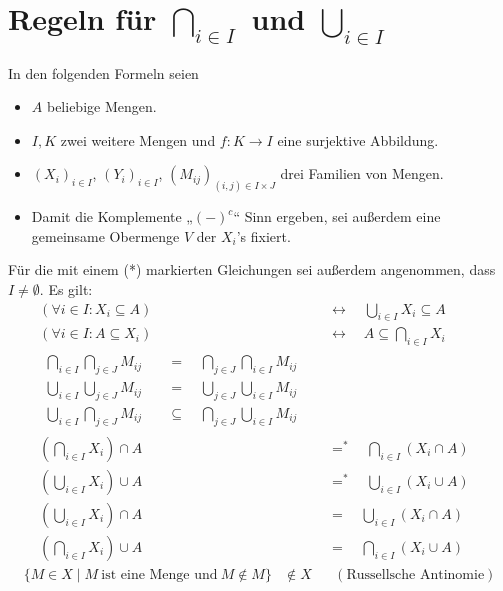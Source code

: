 \endgroup




 
\section{Regeln für $\bigcap_{i\in I}$ und $\bigcup_{i\in I}$}
In den folgenden Formeln seien
\begin{itemize}
    \item $A$ beliebige Mengen.
    \item $I,K$ zwei weitere Mengen und $f:K\to I$ eine surjektive Abbildung.
    \item $(X_i)_{i\in I}$, $(Y_i)_{i\in I}$, $(M_{ij})_{(i,j)\in I\times J}$ drei Familien von Mengen.
    \item Damit die Komplemente „$(-)^c$“ Sinn ergeben, sei außerdem eine gemeinsame Obermenge $V$ der $X_i$'s fixiert.
\end{itemize}
Für die mit einem (*) markierten Gleichungen sei außerdem angenommen, dass $I\neq\emptyset$. Es gilt:
\begingroup
\allowdisplaybreaks
\begin{align*}
    (\forall i\in I : X_i \subseteq A) & \quad\leftrightarrow\quad \bigcup_{i\in I} X_i \subseteq A \\
    (\forall i\in I : A\subseteq X_i) & \quad\leftrightarrow\quad A \subseteq \bigcap_{i\in I} X_i \\[1em]
    \begin{split}
    \bigcap_{i\in I} \bigcap_{j\in J} M_{ij} & \quad =\quad \bigcap_{j\in J}\bigcap_{i\in I} M_{ij} \\
    \bigcup_{i\in I} \bigcup_{j\in J} M_{ij} & \quad =\quad \bigcup_{j\in J}\bigcup_{i\in I} M_{ij} \\
    \bigcup_{i\in I}\bigcap_{j\in J} M_{ij} & \quad\subseteq\quad \bigcap_{j\in J}\bigcup_{i\in I} M_{ij}
    \end{split} && \\[1em]
    (\bigcap_{i\in I} X_i) \cap A & \quad =^* \quad \bigcap_{i \in I} (X_i \cap A) \\
    (\bigcup_{i\in I} X_i) \cup A & \quad =^* \quad \bigcup_{i\in I} (X_i \cup A) \\
    (\bigcup_{i\in I} X_i) \cap A & \quad =\quad \bigcup_{i\in I} (X_i \cap A) \\
    (\bigcap_{i\in I} X_i) \cup A & \quad =\quad \bigcap_{i\in I} (X_i \cup A) %
\end{align*}
\begin{align*}
    \{ M\in X\mid M\ \text{ist eine Menge und}\ M\notin M \} & \notin X && (\text{Russellsche Antinomie})
\end{align*}
